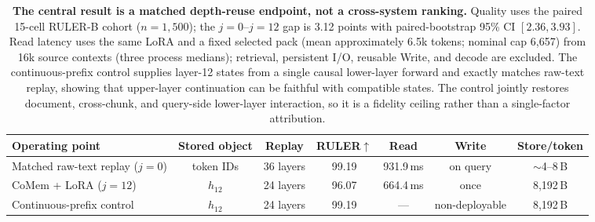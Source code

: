 \begin{table}[!t]
\centering
\scriptsize
\setlength{\tabcolsep}{4.2pt}
\begin{tabular}{@{}lcccccc@{}}
\toprule
\textbf{Operating point} & \textbf{Stored object} & \textbf{Replay} &
\textbf{RULER}$\uparrow$ & \textbf{Read} & \textbf{Write} &
\textbf{Store/token} \\
\midrule
Matched raw-text replay ($j{=}0$) & token IDs & 36 layers &
99.19 & 931.9\,ms & on query & $\sim$4--8\,B \\
CoMem + LoRA ($j{=}12$) & $h_{12}$ & 24 layers &
96.07 & 664.4\,ms & once & 8,192\,B \\
Continuous-prefix control & $h_{12}$ & 24 layers &
99.19 & --- & non-deployable & 8,192\,B \\
\bottomrule
\end{tabular}
\caption{\textbf{The central result is a matched depth-reuse endpoint, not a
cross-system ranking.}
Quality uses the paired 15-cell RULER-B cohort ($n{=}1{,}500$); the
$j{=}0$--$j{=}12$ gap is 3.12 points with paired-bootstrap 95\% CI
$[2.36,3.93]$. Read latency uses the same LoRA and a fixed selected pack
(mean approximately 6.5k tokens; nominal cap 6,657) from 16k source contexts
(three process medians); retrieval, persistent I/O, reusable Write, and decode
are excluded. The continuous-prefix control supplies layer-12 states from a
single causal lower-layer forward and exactly matches raw-text replay, showing
that upper-layer continuation can be faithful with compatible states. The
control jointly restores document, cross-chunk, and query-side lower-layer
interaction, so it is a fidelity ceiling rather than a single-factor
attribution.}
\label{tab:core-tradeoff}
\end{table}
